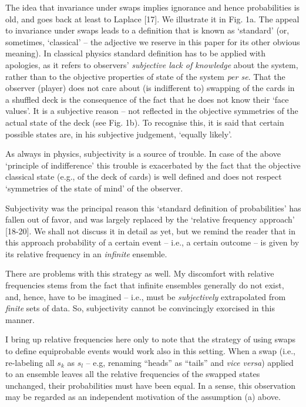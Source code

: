 \documentclass[aps,pra,epsfig,11pt,floatfix]{revtex4}
\begin{document}
The idea that invariance under swaps implies ignorance and hence probabilities
is old, and goes back at least to Laplace [17]. We illustrate it in Fig. 1a. The appeal to
invariance under swaps leads to a definition that is known as `standard' 
(or, sometimes, `classical' -- the adjective we reserve in this paper
for its other obvious meaning). In classical physics standard definition has
to be applied with apologies, as it refers to observers' {\it subjective lack
of knowledge} about the system, rather than to the objective properties of
state of the system {\it per se}. That the observer (player) does not care about 
(is indifferent to) swapping of the cards in a shuffled deck is the consequence 
of the fact that he does not know their  `face values'.  It is a subjective reason
-- not reflected in the objective symmetries of the actual state of the deck 
(see Fig. 1b). To recognise this, it is said that certain possible states are,
in his subjective judgement, `equally likely'.

As always in physics, subjectivity is a source of trouble. In case of the above
`principle of indifference' this trouble is exacerbated by the fact that the objective
classical state (e.g., of the deck of cards) is well defined and does not 
respect `symmetries of the state of mind' of the observer.

Subjectivity was the principal reason this  `standard definition of probabilities' 
has fallen out of
favor, and was largely replaced by the `relative frequency approach' [18-20].
We shall not discuss it in detail as yet, but we remind the reader that in this
approach probability of a certain event -- i.e., a certain outcome -- is given
by its relative frequency in an {\it infinite} ensemble.

There are problems with this strategy as well. My discomfort with relative
frequencies stems from the fact that infinite ensembles generally do not exist,
and, hence, have to be imagined -- i.e., must be {\it subjectively} extrapolated 
from {\it finite} sets of data. So, subjectivity cannot be convincingly
exorcised in this manner.

I bring up relative frequencies here only to note
that the strategy of using swaps to define equiprobable events would work also
in this setting. When a swap (i.e., re-labeling all $s_k$ as $s_l$ -- e.g, renaming
``heads'' as ``tails''
and {\it vice versa}) applied to an ensemble leaves all the relative
frequencies of the swapped states unchanged, their probabilities must have
been equal. In a sense, this observation may be regarded as an independent
motivation of the assumption (a) above.
\end{document}
